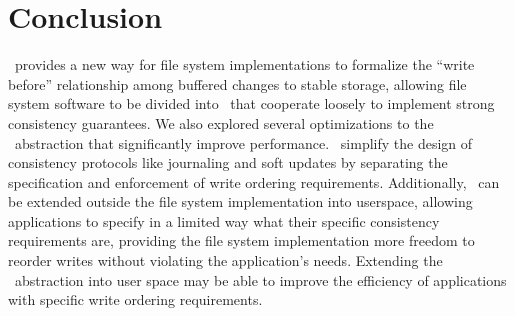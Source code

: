 \section{Conclusion}
\label{sec:conclusion}

\Kudos\ provides a new way for file system implementations to formalize the
``write before'' relationship among buffered changes to stable storage, allowing
file system software to be divided into \modules\ that cooperate loosely to
implement strong consistency guarantees. We also explored several optimizations
to the \patch\ abstraction that significantly improve performance. \Patches\
simplify the design of consistency protocols like journaling and soft updates by
separating the specification and enforcement of write ordering requirements.
Additionally, \patches\ can be extended outside the file system implementation
into userspace, allowing applications to specify in a limited way what their
specific consistency requirements are, providing the file system implementation
more freedom to reorder writes without violating the application's needs.
Extending the \patch\ abstraction into user space may be able to improve the
efficiency of applications with specific write ordering requirements.

